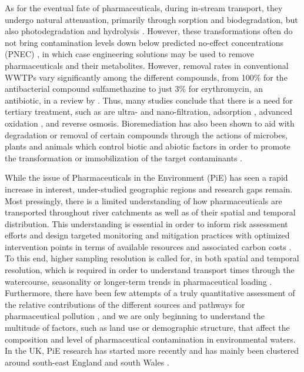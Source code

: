 \documentclass{article}
\begin{document}
As for the eventual fate of pharmaceuticals, during in-stream transport, they undergo natural attenuation, primarily through sorption and biodegradation, but also photodegradation and hydrolysis \citep{Dong2015FateStream}. However, these transformations often do not bring contamination levels down below predicted no-effect concentrations (PNEC) \citep{Li2014OccurrenceSoil}, in which case engineering solutions may be used to remove pharmaceuticals and their metabolites. However, removal rates in conventional WWTPs vary significantly among the different compounds, from 100\% for the antibacterial compound sulfamethazine to just 3\% for erythromycin, an antibiotic, in a review by \citet{Verlicchi2012OccurrenceReview}. Thus, many studies conclude that there is a need for tertiary treatment, such as are ultra- and nano-filtration, adsorption \citep{Quesada2019SurfaceReview}, advanced oxidation \citep{Feng2018Metal-mediatedAssessment}, and reverse osmosis. Bioremediation has also been shown to aid with degradation or removal of certain compounds through the actions of microbes, plants \citep{Li2020PhytoremediationCycle} and animals which control biotic and abiotic factors in order to promote the transformation or immobilization of the target contaminants \citep{Gavrilescu2015EmergingBioremediation,Patel2020EmergingReview}.
    
While the issue of Pharmaceuticals in the Environment (PiE) has seen a rapid increase in interest, under-studied geographic regions and research gaps remain. Most pressingly, there is a limited understanding of how pharmaceuticals are transported throughout river catchments as well as of their spatial and temporal distribution. This understanding is essential in order to inform risk assessment efforts and design targeted monitoring and mitigation practices with optimized intervention points in terms of available resources and associated carbon costs \citep{Domercq2018EmissionResolution}. To this end, higher sampling resolution is called for, in both spatial and temporal resolution, which is required in order to understand transport times through the watercourse, seasonality or longer-term trends in pharmaceutical loading \citep{Burns2018TemporalSystem}. Furthermore, there have been few attempts of a truly quantitative assessment of the relative contributions of the different sources and pathways for pharmaceutical pollution \citep{Comoretto2005ComparingRiver,Kookana2014PotentialCountries}, and we are only beginning to understand the multitude of factors, such as land use or demographic structure, that affect the composition and level of pharmaceutical contamination in environmental waters. In the UK, PiE research has started more recently \citep{Ashton2004InvestigatingKingdom,Bound2006PredictedAssessment} and has mainly been clustered around south-east England and south Wales \citep{Kay2017WidespreadWaters}.
\end{document}

